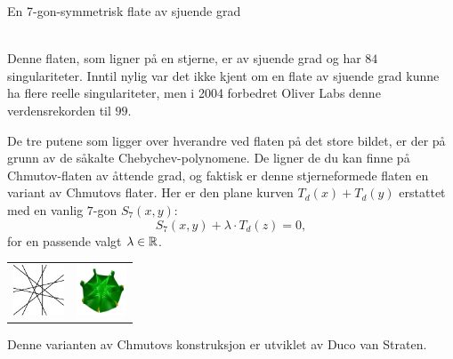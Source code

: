 \documentclass[no]{./../../common/SurferDesc}%
\begin{document}
\footnotesize




\begin{surferPage}
  \begin{surferTitle}En 7-gon-symmetrisk flate av sjuende grad\end{surferTitle}   \\
  
Denne flaten, som ligner på en stjerne, er av sjuende grad og har $84$ singulariteter. Inntil nylig var det ikke kjent om en flate av sjuende grad kunne ha flere reelle singulariteter, men i 2004 forbedret Oliver Labs denne verdensrekorden til $99$. 
  
  
 De tre putene som ligger over hverandre ved flaten på det store bildet, er der på grunn av de såkalte Chebychev-polynomene. De ligner de du kan finne på Chmutov-flaten av åttende grad, og faktisk er denne stjerneformede flaten en variant av Chmutovs flater. Her er den plane kurven $T_d(x)+T_d(y)$ erstattet med en vanlig $7$-gon  $S_7(x,y)$: 
   \[S_7(x,y) + \lambda \cdot T_d(z) = 0,\]
   for en passende valgt $\lambda\in{\mathbb R}$. 
    \vspace*{-0.3em}
    \begin{center}
      \begin{tabular}{c@{\qquad}c}
        \includegraphics[height=1.5cm]{./../../common/images/labsseptic1.pdf}
        &
        \includegraphics[height=1.5cm]{./../../common/images/septic_7eck_von_oben}
      \end{tabular}
    \end{center}
    \vspace*{-0.3em}   
   Denne varianten av Chmutovs konstruksjon er utviklet av Duco van Straten. 


  \begin{surferText}
     \end{surferText}
\end{surferPage}
\end{document}

